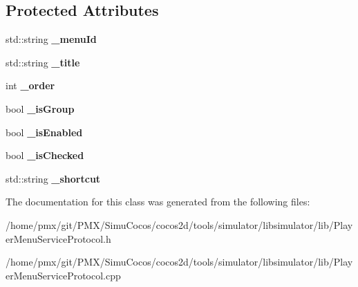 \subsection*{Protected Attributes}
\begin{DoxyCompactItemize}
\item 
\mbox{\label{classPlayerMenuItem_a221ef54258ab1cea73ea026681bd80de}} 
std\+::string {\bfseries \+\_\+menu\+Id}
\item 
\mbox{\label{classPlayerMenuItem_addb36fff19b662811fb673aa181dbea0}} 
std\+::string {\bfseries \+\_\+title}
\item 
\mbox{\label{classPlayerMenuItem_a6300e96f47f73a4e32b7719d3f19ad0f}} 
int {\bfseries \+\_\+order}
\item 
\mbox{\label{classPlayerMenuItem_a44adfdf3f0265aa92832bb791e4d56e5}} 
bool {\bfseries \+\_\+is\+Group}
\item 
\mbox{\label{classPlayerMenuItem_a1d5ba0fef26f8faa567dc35d41d8771c}} 
bool {\bfseries \+\_\+is\+Enabled}
\item 
\mbox{\label{classPlayerMenuItem_a29e4890e40126b0306628779a093e177}} 
bool {\bfseries \+\_\+is\+Checked}
\item 
\mbox{\label{classPlayerMenuItem_a3c7c071f870e99317d57046bdec25fe5}} 
std\+::string {\bfseries \+\_\+shortcut}
\end{DoxyCompactItemize}


The documentation for this class was generated from the following files\+:\begin{DoxyCompactItemize}
\item 
/home/pmx/git/\+P\+M\+X/\+Simu\+Cocos/cocos2d/tools/simulator/libsimulator/lib/Player\+Menu\+Service\+Protocol.\+h\item 
/home/pmx/git/\+P\+M\+X/\+Simu\+Cocos/cocos2d/tools/simulator/libsimulator/lib/Player\+Menu\+Service\+Protocol.\+cpp\end{DoxyCompactItemize}
